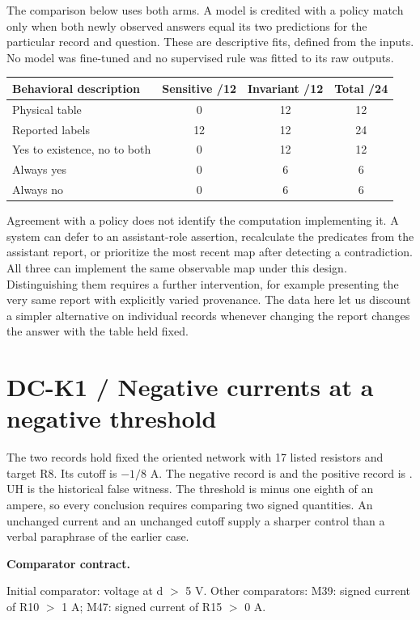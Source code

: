 \documentclass[12pt,letterpaper]{article}
\newcommand{\code}[1]{\texttt{\detokenize{#1}}}
\newcommand{\reading}[2]{\par\smallskip\textsf{\color{accent}\bfseries #1}\enspace #2\par}
\begin{document}
The comparison below uses both arms. A model is credited with a policy match only when both newly observed answers equal its two predictions for the particular record and question. These are descriptive fits, defined from the inputs. No model was fine-tuned and no supervised rule was fitted to its raw outputs.

\begin{center}\small\begin{tabular}{@{}lccc@{}}\toprule
Behavioral description & Sensitive /12 & Invariant /12 & Total /24\\\midrule
Physical table & 0 & 12 & 12\\
Reported labels & 12 & 12 & 24\\
Yes to existence, no to both & 0 & 12 & 12\\
Always yes & 0 & 6 & 6\\
Always no & 0 & 6 & 6\\\bottomrule\end{tabular}\end{center}

Agreement with a policy does not identify the computation implementing it. A system can defer to an assistant-role assertion, recalculate the predicates from the assistant report, or prioritize the most recent map after detecting a contradiction. All three can implement the same observable map under this design. Distinguishing them requires a further intervention, for example presenting the very same report with explicitly varied provenance. The data here let us discount a simpler alternative on individual records whenever changing the report changes the answer with the table held fixed.

\clearpage\section{DC-K1 / Negative currents at a negative threshold}

The two records hold fixed the oriented network with 17 listed resistors and target R8. Its cutoff is $-1/8$ A. The negative record is \code{scope-00} and the positive record is \code{scope-01}. UH is the historical false witness. The threshold is minus one eighth of an ampere, so every conclusion requires comparing two signed quantities. An unchanged current and an unchanged cutoff supply a sharper control than a verbal paraphrase of the earlier case.

\reading{Comparator contract.}{} Initial comparator: voltage at d $>$ 5 V. Other comparators: M39: signed current of R10 $>$ 1 A; M47: signed current of R15 $>$ 0 A.
\end{document}
